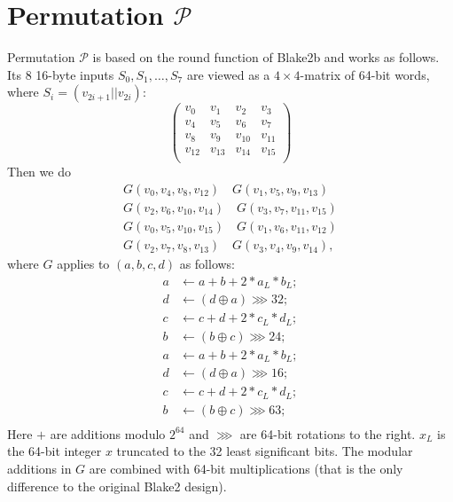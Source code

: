 \documentclass[a4paper]{article}
\begin{document}



\appendix 



\section{Permutation \texorpdfstring{$\mathcal{P}$}{P}}\label{sec:blakeround}

Permutation $\mathcal{P}$  is based on the round function of Blake2b and works as follows. Its 8 16-byte inputs $S_0, S_1,\ldots, S_7$ are viewed as a $4\times 4$-matrix of 64-bit words, where $S_i = (v_{2i+1}||v_{2i})$:
$$
\begin{pmatrix}
  v_0 & v_1 & v_2 & v_3\\
    v_4 & v_5 & v_6 & v_7\\
      v_8 & v_9 & v_{10} & v_{11}\\
        v_{12} & v_{13} & v_{14} & v_{15}\\
\end{pmatrix}
$$
Then we do
\begin{eqnarray*}
G(v_0, v_4, v_8, v_{12})\quad G(v_1, v_5, v_9, v_{13}) \\ G(v_2, v_6, v_{10}, v_{14}) \quad G(v_3, v_7, v_{11}, v_{15})\\
G(v_0, v_5, v_{10}, v_{15})\quad G(v_1, v_6, v_{11}, v_{12}) \\ G(v_2, v_7, v_{8}, v_{13}) \quad G(v_3, v_4, v_{9}, v_{14}),
\end{eqnarray*}
where $G$  applies to $(a,b,c,d)$ as follows:
\begin{equation}\label{eq:blake-orig}
\begin{aligned}
  a &\leftarrow a + b+ 2*a_L*b_L;\\
  d &\leftarrow (d\oplus a)\ggg 32;\\
  c &\leftarrow c + d+ 2*c_L*d_L;\\
  b &\leftarrow (b\oplus c)\ggg 24;\\
    a &\leftarrow a + b+ 2*a_L*b_L;\\
  d &\leftarrow (d\oplus a)\ggg 16;\\
  c &\leftarrow c + d+ 2*c_L*d_L;\\
  b &\leftarrow (b\oplus c)\ggg 63;\\
\end{aligned}
\end{equation}
Here $+$ are additions modulo $2^{64}$ and $\ggg$ are 64-bit rotations to the right. $x_L$ is the 64-bit integer $x$ truncated to the 32 least significant bits. The modular additions in $G$ are combined with 64-bit multiplications (that is the only difference to the original Blake2 design). 
\end{document}

